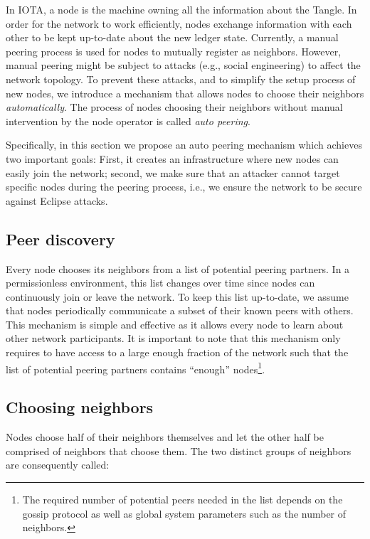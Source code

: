 \documentclass[../main.tex]{subfiles}
\begin{document}
In IOTA, a node is the machine owning all the information about the Tangle. In order for the network to work efficiently, nodes exchange information with each other to be kept up-to-date about the new ledger state. Currently, a manual peering process is used for nodes to mutually register as neighbors. However, manual peering might be subject to attacks (e.g., social engineering) to affect the network topology. To prevent these attacks, and to simplify the setup process of new nodes, we introduce a mechanism that allows nodes to choose their neighbors \textit{automatically}. The process of nodes choosing their neighbors without manual intervention by the node operator is called \emph{auto peering}.

Specifically, in this section we propose an auto peering mechanism which achieves two important goals: First, it creates an infrastructure where new nodes can easily join the network; second, we make sure that an attacker cannot target specific nodes during the peering process, i.e., we ensure the network to be secure against Eclipse attacks.

\subsection{Peer discovery}

Every node chooses its neighbors from a list of potential peering partners. In a permissionless environment, this list changes over time since nodes can continuously join or leave the network. To keep this list up-to-date, we assume that nodes periodically communicate a subset of their known peers with others. This mechanism is simple and effective as it allows every node to learn about other network participants. It is important to note that this mechanism only requires to have access to a large enough fraction of the network such that the list of potential peering partners contains \enquote{enough} nodes\footnote{The required number of potential peers needed in the list depends on the gossip protocol as well as global system parameters such as the number of neighbors.}.

\subsection{Choosing neighbors}

Nodes choose half of their neighbors themselves and let the other half be comprised of neighbors that choose them. The two distinct groups of neighbors are consequently called:
\end{document}
